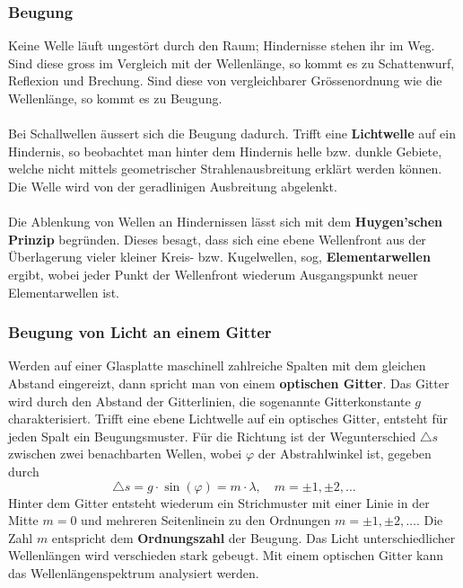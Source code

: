 \subsubsection{Beugung}
Keine Welle läuft ungestört durch den Raum; Hindernisse stehen ihr im Weg. Sind diese gross im Vergleich mit der Wellenlänge, so kommt es zu Schattenwurf, Reflexion und Brechung. Sind diese von vergleichbarer Grössenordnung wie die Wellenlänge, so kommt es zu Beugung.
\\\\
Bei Schallwellen äussert sich die Beugung dadurch. Trifft eine \textbf{Lichtwelle} auf ein Hindernis, so beobachtet man hinter dem Hindernis helle bzw. dunkle Gebiete, welche nicht mittels geometrischer Strahlenausbreitung erklärt werden können. Die Welle wird von der geradlinigen Ausbreitung abgelenkt.
\\\\
Die Ablenkung von Wellen an Hindernissen lässt sich mit dem \textbf{Huygen'schen Prinzip} begründen. Dieses besagt, dass sich eine ebene Wellenfront aus der Überlagerung vieler kleiner Kreis- bzw. Kugelwellen, sog, \textbf{Elementarwellen} ergibt, wobei jeder Punkt der Wellenfront wiederum Ausgangspunkt neuer Elementarwellen ist.
\subsubsection{Beugung von Licht an einem Gitter}
Werden auf einer Glasplatte maschinell zahlreiche Spalten mit dem gleichen Abstand eingereizt, dann spricht man von einem \textbf{optischen Gitter}. Das Gitter wird durch den Abstand der Gitterlinien, die sogenannte Gitterkonstante $g$ charakterisiert. Trifft eine ebene Lichtwelle auf ein optisches Gitter, entsteht für jeden Spalt ein Beugungsmuster. Für die Richtung ist der Wegunterschied $\triangle s$ zwischen zwei benachbarten Wellen, wobei $\varphi$ der Abstrahlwinkel ist, gegeben durch
\begin{equation}
\boxed{\triangle s=g\cdot \sin\left(\varphi\right)=m\cdot \lambda,\quad m=\pm 1, \pm 2, \dotso}
\end{equation}
Hinter dem Gitter entsteht wiederum ein Strichmuster mit einer Linie in der Mitte $m=0$ und mehreren Seitenlinein zu den Ordnungen $m=\pm 1, \pm 2, \dotso$. Die Zahl $m$ entspricht dem \textbf{Ordnungszahl} der Beugung. Das Licht unterschiedlicher Wellenlängen wird verschieden stark gebeugt. Mit einem optischen Gitter kann das Wellenlängenspektrum analysiert werden.
